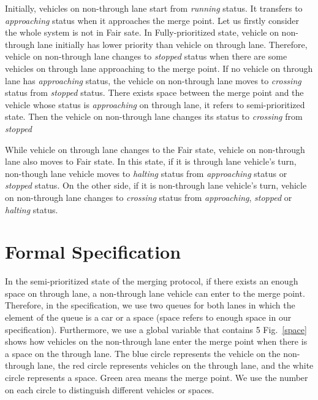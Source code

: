 \documentclass[10pt, conference, compsocconf]{IEEEtran}
\begin{document}
Initially, vehicles on non-through lane start from \textit{running} status.
It transfers to \textit{approaching} status when it approaches the merge point.
Let us firstly consider the whole system is not in Fair sate.
In Fully-prioritized state, vehicle on non-through lane initially has lower priority than vehicle on through lane.
Therefore, vehicle on non-through lane changes to \textit{stopped} status when there are some vehicles on through lane approaching to the merge point.
If no vehicle on through lane has \textit{approaching} status, the vehicle on non-through lane moves to \textit{crossing} status from \textit{stopped} status.
There exists space between the merge point and the vehicle whose status is \textit{approaching} on through lane, it refers to semi-prioritized state. 
Then the vehicle on non-through lane changes its status to \textit{crossing} from \textit{stopped}

While vehicle on through lane changes to the Fair state, vehicle on non-through lane also moves to Fair state. 
In this state, if it is through lane vehicle's turn, non-though lane vehicle moves to \textit{halting} status from \textit{approaching} status or \textit{stopped} status. 
On the other side, if it is non-through lane vehicle's turn, vehicle on non-through lane changes to \textit{crossing} status from \textit{approaching}, \textit{stopped} or \textit{halting} status. 
 


 
\section{Formal Specification}
 \label{sect_formal}
In the semi-prioritized state of the merging protocol, if there exists an enough space on through lane, a non-through lane vehicle can enter to the merge point.
Therefore, in the specification, we use two queues for both lanes in which the element of the queue is a car or a space (space refers to enough space in our specification).
Furthermore, we use a global variable that contains 5
Fig.~\ref{space} shows how vehicles on the non-through lane enter the merge point when there is a space on the through lane. 
The blue circle represents the vehicle on the non-through lane, the red circle represents vehicles on the through lane, and the white circle represents a space. 
Green area means the merge point.
We use the number on each circle to distinguish different vehicles or spaces.
\end{document}
